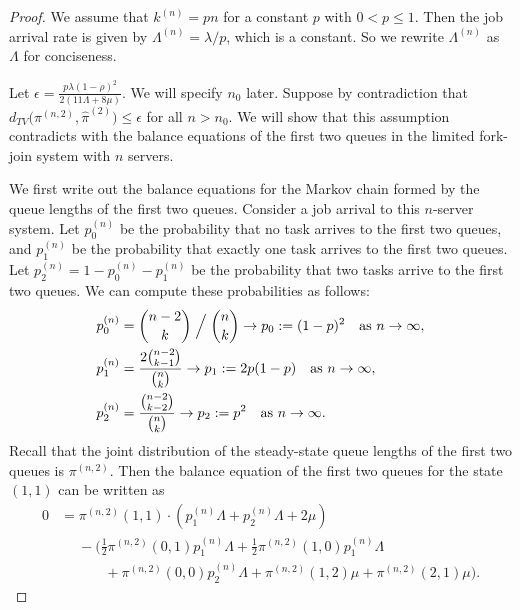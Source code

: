 \documentclass[sigconf]{acmart}
\newcommand{\supn}{^{(n)}}
\begin{document}
\begin{proof}
We assume that $k\supn = p n$ for a constant $p$ with $0<p\le 1$.  Then the job arrival rate is given by $\Lambda\supn = \lambda/p$, which is a constant.  So we rewrite $\Lambda\supn$ as $\Lambda$ for conciseness.


Let $\epsilon=\frac{p\lambda(1-\rho)^2}{2(11\Lambda+8\mu)}$.  We will specify $n_0$ later.  Suppose by contradiction that $d_{TV}\bigl(\pi^{(n,2)},\hat{\pi}^{(2)}\bigr)\le \epsilon$ for all $n>n_0$.  We will show that this assumption contradicts with the balance equations of the first two queues in the limited fork-join system with $n$ servers.


We first write out the balance equations for the Markov chain formed by the queue lengths of the first two queues. Consider a job arrival to this $n$-server system.  Let $p_0\supn$ be the probability that no task arrives to the first two queues, and $p_1\supn$ be the probability that exactly one task arrives to the first two queues. Let $p_2\supn=1-p_0\supn-p_1\supn$ be the probability that two tasks arrive to the first two queues.  We can compute these probabilities as follows:
\begin{align*}
p_0\supn &= \binom{n-2}{k}\Bigm / \binom{n}{k} \rightarrow p_0:=(1-p)^2 \quad \text{as }n\to \infty,\\
p_1\supn &= \frac{2\binom{n-2}{k-1}}{\binom{n}{k}} \rightarrow p_1:=2p(1-p) \quad \text{as }n \rightarrow \infty,\\
p_2\supn &= \frac{\binom{n-2}{k-2}}{\binom{n}{k}} \rightarrow p_2:=p^2 \quad \text{as }n \rightarrow \infty.
\end{align*}
Recall that the joint distribution of the steady-state queue lengths of the first two queues is $\pi^{(n,2)}$.  Then the balance equation of the first two queues for the state $(1,1)$ can be written as
\begin{align}
0&=\pi^{(n,2)}(1,1) \cdot (p_1\supn\Lambda+p_2\supn\Lambda+2\mu)\nonumber\\
&\mspace{23mu}-\biggl(\frac{1}{2}\pi^{(n,2)}(0,1)p_1\supn\Lambda+\frac{1}{2}\pi^{(n,2)}(1,0)p_1\supn\Lambda\label{eqn: balance}\\
&\mspace{57mu}+\pi^{(n,2)}(0,0)p_2\supn\Lambda+\pi^{(n,2)}(1,2)\mu+\pi^{(n,2)}(2,1)\mu\biggr).\nonumber
\end{align}




\end{proof}
\end{document}
